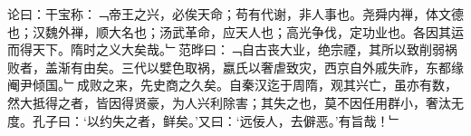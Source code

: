 论曰：干宝称：﹁帝王之兴，必俟天命；苟有代谢，非人事也。尧舜内禅，体文德也；汉魏外禅，顺大名也；汤武革命，应天人也；高光争伐，定功业也。各因其运而得天下。隋时之义大矣哉。﹂范晔曰：﹁自古丧大业，绝宗禋，其所以致削弱祸败者，盖渐有由矣。三代以嬖色取祸，嬴氏以奢虐致灾，西京自外戚失祚，东都缘阉尹倾国。﹂成败之来，先史商之久矣。自秦汉迄于周隋，观其兴亡，虽亦有数，然大抵得之者，皆因得贤豪，为人兴利除害；其失之也，莫不因任用群小，奢汰无度。孔子曰：‘以约失之者，鲜矣。’又曰：‘远佞人，去僻恶。’有旨哉！﹂\\%
%
